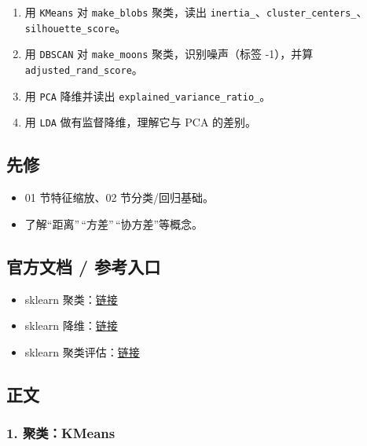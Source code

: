 \begin{enumerate}
\def\labelenumi{\arabic{enumi}.}
\tightlist
\item
  用 \texttt{KMeans} 对 \texttt{make\_blobs} 聚类，读出
  \texttt{inertia\_}、\texttt{cluster\_centers\_}、\texttt{silhouette\_score}。
\item
  用 \texttt{DBSCAN} 对 \texttt{make\_moons} 聚类，识别噪声（标签
  -1），并算 \texttt{adjusted\_rand\_score}。
\item
  用 \texttt{PCA} 降维并读出 \texttt{explained\_variance\_ratio\_}。
\item
  用 \texttt{LDA} 做有监督降维，理解它与 PCA 的差别。
\end{enumerate}

\subsection{先修}\label{ux5148ux4fee-23}

\begin{itemize}
\tightlist
\item
  01 节特征缩放、02 节分类/回归基础。
\item
  了解``距离''\,``方差''\,``协方差''等概念。
\end{itemize}

\subsection{官方文档 /
参考入口}\label{ux5b98ux65b9ux6587ux6863-ux53c2ux8003ux5165ux53e3-9}

\begin{itemize}
\tightlist
\item
  sklearn
  聚类：\href{https://scikit-learn.org/stable/modules/clustering.html}{链接}
\item
  sklearn
  降维：\href{https://scikit-learn.org/stable/modules/decomposition.html}{链接}
\item
  sklearn
  聚类评估：\href{https://scikit-learn.org/stable/modules/clustering.html\#clustering-performance-evaluation}{链接}
\end{itemize}

\subsection{正文}\label{ux6b63ux6587-2}

\subsubsection{1. 聚类：KMeans}\label{ux805aux7c7bkmeans}

